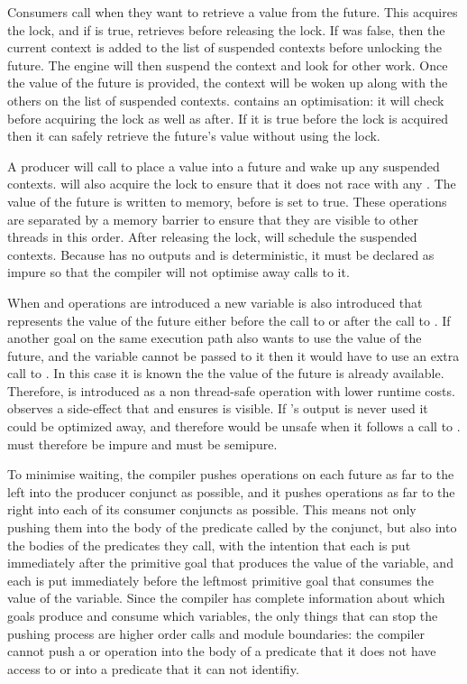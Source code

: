 Consumers call \wait when they want to retrieve a value from the future.
This acquires the lock, and if  is true, retrieves
 before releasing the lock.
If  was false, then the current context is added to
the list of suspended contexts before unlocking the future.
The engine will then suspend the context and look for other work.
Once the value of the future is provided,
the context will be woken up along with the others on the list of suspended contexts.
\wait contains an optimisation:
it will check  before
acquiring the lock as well as after.
If it is true before the lock is acquired then it can safely retrieve the
future's value without using the lock.

A producer will call \signal to place a value into a future and wake up any
suspended contexts.
\signal will also acquire the lock to ensure that it does not race with any \wait.
The value of the future is written to memory,
before 
 is set to true.
These operations are separated by a memory barrier to ensure that they are
visible to other threads in this order.
After releasing the lock, \signal will schedule the suspended contexts.
Because \signal has no outputs and is deterministic,
it must be declared as impure so that the compiler will not optimise away calls
to it.

When \wait and \signal operations are introduced
a new variable is also introduced
that represents the value of the future
either before the call to \signal or after the call to \wait.
If another goal on the same execution path also wants to use the value of
the future, and the variable cannot be passed to it then it would have to
use an extra call to \wait.
In this case it is known the the value of the future is already available.
Therefore,
\get is introduced as a non thread-safe operation with lower runtime costs.
\get observes a side-effect that \wait and \signal ensures is visible.
If \wait's output is never used it could be optimized away,
and therefore \get would be unsafe when it follows a call to \wait.
\wait must therefore be impure and \get must be semipure.

To minimise waiting,
the compiler pushes \signal operations on each future
as far to the left into the producer conjunct as possible,
and it pushes \wait operations
as far to the right into each of its consumer conjuncts as possible.
This means not only pushing them
into the body of the predicate called by the conjunct,
but also into the bodies of the predicates they call,
with the intention that
each \signal is put immediately after
the primitive goal that produces the value of the variable,
and each \wait is put immediately before
the leftmost primitive goal that consumes the value of the variable.
Since the compiler has complete information
about which goals produce and consume which variables,
the only things that can stop the pushing process
are higher order calls and module boundaries:
the compiler cannot push a \wait or \signal operation
into the body of a predicate that it does not have access to
or into a predicate that it can not identifiy.

